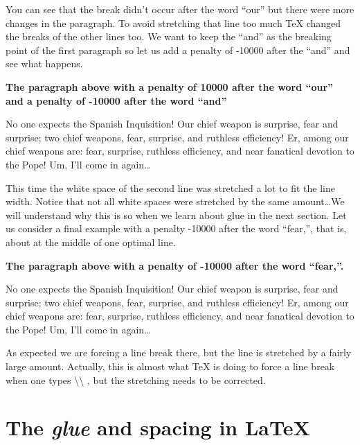 \documentclass[a4paper]{article}
\newcommand{\bs}[1]{{\rmfamily\color{blue}\textbackslash{}#1}}
\newenvironment{example}[1]{%
\vspace{10pt}
\noindent\textbf{#1}\sffamily\par\vspace{10pt}%
}
{%
\par\vspace{10pt}
}
\begin{document}
\noindent You can see that the break didn't occur after the word ``our'' but there were more changes in the paragraph. To avoid stretching that line too much \TeX{} changed the breaks of the other lines too. We want to keep the ``and'' as the breaking point of the first paragraph so let us add a penalty of -10000 after the ``and'' and see what happens.

\begin{example}{The paragraph above with a penalty of 10000 after the word ``our'' and a penalty of -10000 after the word ``and''}
No one expects the Spanish Inquisition! Our chief weapon is surprise, fear and{} surprise; two chief weapons, fear, surprise, and ruthless efficiency! Er, among our{} chief weapons are: fear, surprise, ruthless efficiency, and near fanatical devotion to the Pope! Um, I'll come in again\dots
\end{example}

\noindent This time the white space of the second line was stretched a lot to fit the line width. Notice that not all white spaces were stretched by the same amount\dots We will understand why this is so when we learn about glue in the next section. Let us consider a final example with a penalty -10000 after the word ``fear,'', that is, about at the middle of one optimal line.

\begin{example}{The paragraph above with a penalty of -10000 after the word ``fear,''.}
No one expects the Spanish Inquisition! Our chief weapon is surprise, fear and surprise; two chief weapons, fear,{} surprise, and ruthless efficiency! Er, among our chief weapons are: fear, surprise, ruthless efficiency, and near fanatical devotion to the Pope! Um, I'll come in again\dots
\end{example}

\noindent As expected we are forcing a line break there, but the line is stretched by a fairly large amount. Actually, this is almost what \TeX{} is doing to force a line break when one types \bs{\bs{ }}, but the stretching needs to be corrected.

\section{The \emph{glue} and spacing in \LaTeX}
\end{document}
